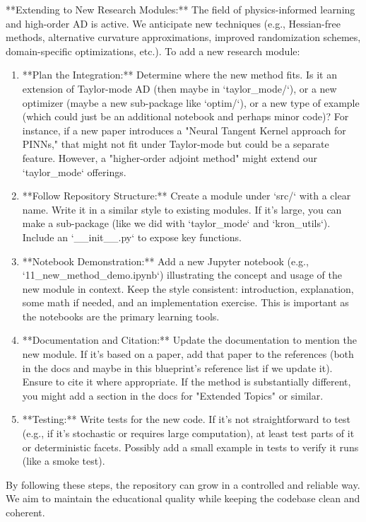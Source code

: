 \documentclass[11pt]{article}
\begin{document}
**Extending to New Research Modules:**
The field of physics-informed learning and high-order AD is active. We anticipate new techniques (e.g., Hessian-free methods, alternative curvature approximations, improved randomization schemes, domain-specific optimizations, etc.). To add a new research module:
\begin{enumerate}
  \item **Plan the Integration:** Determine where the new method fits. Is it an extension of Taylor-mode AD (then maybe in `taylor_mode/`), or a new optimizer (maybe a new sub-package like `optim/`), or a new type of example (which could just be an additional notebook and perhaps minor code)? For instance, if a new paper introduces a "Neural Tangent Kernel approach for PINNs," that might not fit under Taylor-mode but could be a separate feature. However, a "higher-order adjoint method" might extend our `taylor_mode` offerings.
  \item **Follow Repository Structure:** Create a module under `src/` with a clear name. Write it in a similar style to existing modules. If it’s large, you can make a sub-package (like we did with `taylor_mode` and `kron_utils`). Include an `__init__.py` to expose key functions.
  \item **Notebook Demonstration:** Add a new Jupyter notebook (e.g., `11_new_method_demo.ipynb`) illustrating the concept and usage of the new module in context. Keep the style consistent: introduction, explanation, some math if needed, and an implementation exercise. This is important as the notebooks are the primary learning tools.
  \item **Documentation and Citation:** Update the documentation to mention the new module. If it’s based on a paper, add that paper to the references (both in the docs and maybe in this blueprint’s reference list if we update it). Ensure to cite it where appropriate. If the method is substantially different, you might add a section in the docs for "Extended Topics" or similar.
  \item **Testing:** Write tests for the new code. If it's not straightforward to test (e.g., if it’s stochastic or requires large computation), at least test parts of it or deterministic facets. Possibly add a small example in tests to verify it runs (like a smoke test).
\end{enumerate}

By following these steps, the repository can grow in a controlled and reliable way. We aim to maintain the educational quality while keeping the codebase clean and coherent.
\end{document}
